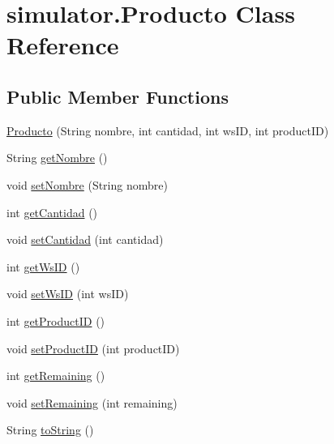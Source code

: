 \hypertarget{classsimulator_1_1_producto}{}\section{simulator.\+Producto Class Reference}
\label{classsimulator_1_1_producto}
\subsection*{Public Member Functions}
\begin{DoxyCompactItemize}
\item 
\mbox{\hyperlink{classsimulator_1_1_producto_a8ed98f559ef18c7681a41daf22397ee4}{Producto}} (String nombre, int cantidad, int ws\+ID, int product\+ID)
\item 
String \mbox{\hyperlink{classsimulator_1_1_producto_a1399ce876e1f4cd24c7f1f60da446c1f}{get\+Nombre}} ()
\item 
void \mbox{\hyperlink{classsimulator_1_1_producto_a9db8049ac3a8b1da4117e548bc7b005f}{set\+Nombre}} (String nombre)
\item 
int \mbox{\hyperlink{classsimulator_1_1_producto_af5946c71fa4afa0a7d2040c7aa8e080e}{get\+Cantidad}} ()
\item 
void \mbox{\hyperlink{classsimulator_1_1_producto_ac48ac8d5a9dafc76dde405d60bda6611}{set\+Cantidad}} (int cantidad)
\item 
int \mbox{\hyperlink{classsimulator_1_1_producto_a98f367bc18c4de722ee6a08a4ba0a31e}{get\+Ws\+ID}} ()
\item 
void \mbox{\hyperlink{classsimulator_1_1_producto_af777b058acf8120624ce58d1b5da26d1}{set\+Ws\+ID}} (int ws\+ID)
\item 
int \mbox{\hyperlink{classsimulator_1_1_producto_a28b4edc0f966aa82fc53af57a294e808}{get\+Product\+ID}} ()
\item 
void \mbox{\hyperlink{classsimulator_1_1_producto_aaeb11d43521509b90df6e722e18b9382}{set\+Product\+ID}} (int product\+ID)
\item 
int \mbox{\hyperlink{classsimulator_1_1_producto_a4c2960024b49a7e4d28752ffde30e3c7}{get\+Remaining}} ()
\item 
void \mbox{\hyperlink{classsimulator_1_1_producto_a2df4995ec8370f2af6d72e7d9cd5aa8a}{set\+Remaining}} (int remaining)
\item 
String \mbox{\hyperlink{classsimulator_1_1_producto_a31114900c2dcf40e36fbc4b6b55ce985}{to\+String}} ()
\end{DoxyCompactItemize}


